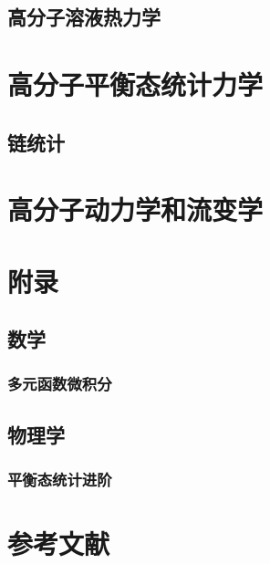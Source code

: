\documentclass[zihao=5,linespread=1.3,b5paper,heading=true,twoside]{ctexbook}
\theoremstyle{definition}
\theoremstyle{plain}
\begin{document}
\chapter{高分子溶液热力学}

\part{高分子平衡态统计力学}
\chapter{链统计}
\part{高分子动力学和流变学}

\part{附录}
\chapter{数学}
\section{多元函数微积分}

\chapter{物理学}
\section{平衡态统计进阶}


\newpage\part*{参考文献}
\printbibliography[heading=none]
\end{document}
